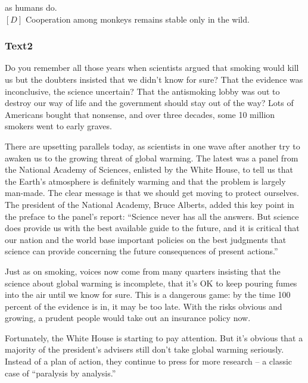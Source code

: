 \documentclass[a4paper]{article}
\begin{document}
as humans do.\\$[D]$ Cooperation among monkeys remains stable only in the wild.\\\subsubsection{Text2}

\par
Do you remember all those years when scientists argued that smoking would kill us but the doubters insisted that we didn’t know for sure? That the evidence was inconclusive, the science uncertain? That the antismoking lobby was out to destroy our way of life and the government should stay out of the way? Lots of Americans bought that nonsense, and over three decades, some 10 million smokers went to early graves.

\par
There are upsetting parallels today, as scientists in one wave after another try to awaken us to the growing threat of global warming. The latest was a panel from the National Academy of Sciences, enlisted by the White House, to tell us that the Earth’s atmosphere is definitely warming and that the problem is largely man-made. The clear message is that we should get moving to protect ourselves. The president of the National Academy, Bruce Alberts, added this key point in the preface to the panel’s report: “Science never has all the answers. But science does provide us with the best available guide to the future, and it is critical that our nation and the world base important policies on the best judgments that science can provide concerning the future consequences of present actions.”

\par
Just as on smoking, voices now come from many quarters insisting that the science about global warming is incomplete, that it’s OK to keep pouring fumes into the air until we know for sure. This is a dangerous game: by the time 100 percent of the evidence is in, it may be too late. With the risks obvious and growing, a prudent people would take out an insurance policy now.

\par
Fortunately, the White House is starting to pay attention. But it’s obvious that a majority of the president’s advisers still don’t take global warming seriously. Instead of a plan of action, they continue to press for more research -- a classic case of “paralysis by analysis.”
\end{document}
